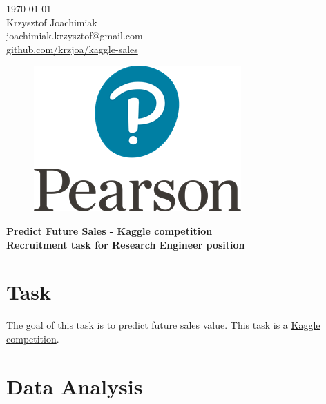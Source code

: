 \documentclass[12pt,twoside,a4paper]{memoir}
\makeatletter
\def \authors 	{Krzysztof Joachimiak}	%
\def \title 		{Predict Future Sales - Kaggle competition}
\def \subtitle		{Recruitment task for Research Engineer position}	%
\def \revision	{1.0}
\def \authemail	{joachimiak.krzysztof@gmail.com}
\makeatother
\begin{document}
	\thispagestyle{empty}

	\begin{flushright}
		\today \\
		\authors \\
		\authemail \\
		\href{https://github.com/krzjoa/kaggle-sales}{github.com/krzjoa/kaggle-sales} \\
		
	\end{flushright}


\hspace{0pt}
\vfill
	\begin{figure}[ht]
		\centering
		\includegraphics[scale=1.]{img/pearson.png}
	\end{figure}

	\begin{center}
	\vspace{10pt}
	\huge{\textbf{ \title \\ }}
	\vspace{10pt}
	\Large{\textbf{ \subtitle \\ }}
	\vspace{20pt}
	\end{center}
\vfill
\hspace{0pt}
	
\newpage
\tableofcontents

	
\newpage
\section{Task}
The goal of this task is to predict future sales value. This task is a \href{https://www.kaggle.com/c/competitive-data-science-predict-future-sales}{Kaggle competition}.

\section{Data Analysis}
\end{document}
